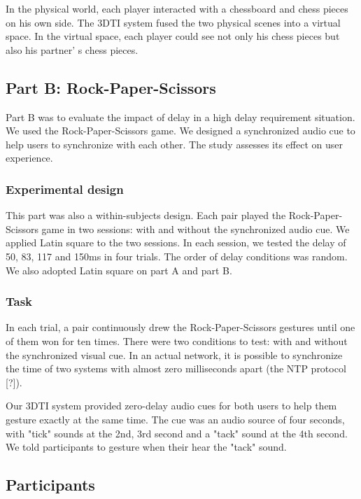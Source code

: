 In the physical world, each player interacted with a chessboard and chess pieces on his own side. The 3DTI system fused the two physical scenes into a virtual space. In the virtual space, each player could see not only his chess pieces but also his partner' s chess pieces.

\subsection{Part B: Rock-Paper-Scissors}

Part B was to evaluate the impact of delay in a high delay requirement situation. We used the Rock-Paper-Scissors game. We designed a synchronized audio cue to help users to synchronize with each other. The study assesses its effect on user experience.

\subsubsection{Experimental design}

This part was also a within-subjects design. Each pair played the Rock-Paper-Scissors game in two sessions: with and without the synchronized audio cue. We applied Latin square to the two sessions. In each session, we tested the delay of 50, 83, 117 and 150ms in four trials. The order of delay conditions was random. We also adopted Latin square on part A and part B.

\subsubsection{Task}

In each trial, a pair continuously drew the Rock-Paper-Scissors gestures until one of them won for ten times. There were two conditions to test: with and without the synchronized visual cue. In an actual network, it is possible to synchronize the time of two systems with almost zero milliseconds apart (the NTP protocol [?]).

Our 3DTI system provided zero-delay audio cues for both users to help them gesture exactly at the same time. The cue was an audio source of four seconds, with "tick" sounds at the 2nd, 3rd second and a "tack" sound at the 4th second. We told participants to gesture when their hear the "tack" sound.

\subsection{Participants}

